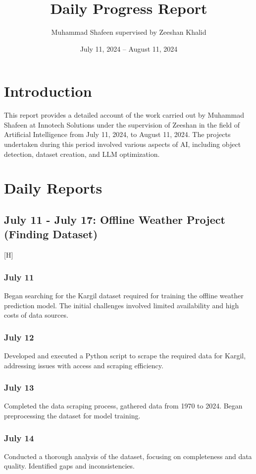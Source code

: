\documentclass{report}
\title{Daily Progress Report}
\author{Muhammad Shafeen supervised by Zeeshan Khalid }
\date{July 11, 2024 – August 11, 2024}
\begin{document}
\maketitle

\tableofcontents

\chapter{Introduction}
This report provides a detailed account of the work carried out by Muhammad Shafeen at Innotech Solutions under the supervision of Zeeshan in the field of Artificial Intelligence from July 11, 2024, to August 11, 2024. The projects undertaken during this period involved various aspects of AI, including object detection, dataset creation, and LLM optimization.

\chapter{Daily Reports}

\section{July 11 - July 17: Offline Weather Project (Finding Dataset)}[H]

\subsection*{July 11}
Began searching for the Kargil dataset required for training the offline weather prediction model. The initial challenges involved limited availability and high costs of data sources.

\subsection*{July 12}
Developed and executed a Python script to scrape the required data for Kargil, addressing issues with access and scraping efficiency.

\subsection*{July 13}
Completed the data scraping process, gathered data from 1970 to 2024. Began preprocessing the dataset for model training.

\subsection*{July 14}
Conducted a thorough analysis of the dataset, focusing on completeness and data quality. Identified gaps and inconsistencies.
\end{document}
